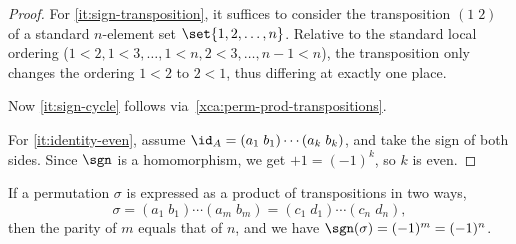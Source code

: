 \begin{proof}
  For \ref{it:sign-transposition},
  it suffices to consider the transposition $(1\;2)$ of a 
  standard $n$-element set $\set{1,2,\dots,n}$.
  Relative to the standard local ordering 
  ($1<2,1<3,\dots,1<n,2<3,\ldots,n-1<n$),
  the transposition only changes the ordering $1<2$ to $2<1$,
  thus differing at exactly one place.

  Now \ref{it:sign-cycle} follows via~\cref{xca:perm-prod-transpositions}.

  For \ref{it:identity-even}, assume $\id_A = (a_1\;b_1)\cdots(a_k\;b_k)$,
  and take the sign of both sides. Since $\sgn$ is a homomorphism,
  we get $+1 = (-1)^k$, so $k$ is even.
\end{proof}

\begin{corollary}\label{cor:sign-defined}
  If a permutation $\sigma$ is expressed as a product of transpositions in two ways,
  \[
    \sigma = (a_1\;b_1)\cdots(a_m\;b_m)
    = (c_1\;d_1)\cdots(c_n\;d_n),
  \]
  then the parity of $m$ equals that of $n$,
  and we have $\sgn(\sigma)=(-1)^m=(-1)^n$.
\end{corollary}

